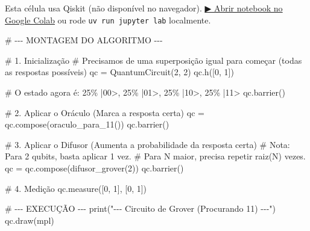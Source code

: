 \documentclass[
  brazilian,
]{report}
\newenvironment{Shaded}{\begin{snugshade}}{\end{snugshade}}
\newcommand{\BuiltInTok}[1]{\textcolor[rgb]{0.00,0.23,0.31}{#1}}
\newcommand{\CommentTok}[1]{\textcolor[rgb]{0.37,0.37,0.37}{#1}}
\newcommand{\DecValTok}[1]{\textcolor[rgb]{0.68,0.00,0.00}{#1}}
\newcommand{\NormalTok}[1]{\textcolor[rgb]{0.00,0.23,0.31}{#1}}
\newcommand{\OperatorTok}[1]{\textcolor[rgb]{0.37,0.37,0.37}{#1}}
\newcommand{\StringTok}[1]{\textcolor[rgb]{0.13,0.47,0.30}{#1}}
\begin{document}
\begin{tcolorbox}[enhanced jigsaw, arc=.35mm, bottomrule=.15mm, bottomtitle=1mm, breakable, colback=white, colbacktitle=quarto-callout-warning-color!10!white, colframe=quarto-callout-warning-color-frame, coltitle=black, left=2mm, leftrule=.75mm, opacityback=0, opacitybacktitle=0.6, rightrule=.15mm, title=\textcolor{quarto-callout-warning-color}{\faExclamationTriangle}\hspace{0.5em}{⚛️ Célula Qiskit --- execute no Colab ou localmente}, titlerule=0mm, toprule=.15mm, toptitle=1mm]

Esta célula usa Qiskit (não disponível no navegador).
\href{https://colab.research.google.com/github/maxwellamaral/aula-quantum/blob/main/notebooks/06-grover.ipynb}{▶
Abrir notebook no Google Colab} ou rode \texttt{uv\ run\ jupyter\ lab}
localmente.

\begin{Shaded}
\begin{Highlighting}[]


\CommentTok{\# {-}{-}{-} MONTAGEM DO ALGORITMO {-}{-}{-}}

\CommentTok{\# 1. Inicialização}
\CommentTok{\# Precisamos de uma superposição igual para começar (todas as respostas possíveis)}
\NormalTok{qc }\OperatorTok{=}\NormalTok{ QuantumCircuit(}\DecValTok{2}\NormalTok{, }\DecValTok{2}\NormalTok{)}
\NormalTok{qc.h([}\DecValTok{0}\NormalTok{, }\DecValTok{1}\NormalTok{])}

\CommentTok{\# O estado agora é: 25\% |00\textgreater{}, 25\% |01\textgreater{}, 25\% |10\textgreater{}, 25\% |11\textgreater{}}
\NormalTok{qc.barrier()}

\CommentTok{\# 2. Aplicar o Oráculo (Marca a resposta certa)}
\NormalTok{qc }\OperatorTok{=}\NormalTok{ qc.compose(oraculo\_para\_11())}
\NormalTok{qc.barrier()}

\CommentTok{\# 3. Aplicar o Difusor (Aumenta a probabilidade da resposta certa)}
\CommentTok{\# Nota: Para 2 qubits, basta aplicar 1 vez.}
\CommentTok{\# Para N maior, precisa repetir raiz(N) vezes.}
\NormalTok{qc }\OperatorTok{=}\NormalTok{ qc.compose(difusor\_grover(}\DecValTok{2}\NormalTok{))}
\NormalTok{qc.barrier()}

\CommentTok{\# 4. Medição}
\NormalTok{qc.measure([}\DecValTok{0}\NormalTok{, }\DecValTok{1}\NormalTok{], [}\DecValTok{0}\NormalTok{, }\DecValTok{1}\NormalTok{])}

\CommentTok{\# {-}{-}{-} EXECUÇÃO {-}{-}{-}}
\BuiltInTok{print}\NormalTok{(}\StringTok{"{-}{-}{-} Circuito de Grover (Procurando \textquotesingle{}11\textquotesingle{}) {-}{-}{-}"}\NormalTok{)}
\NormalTok{qc.draw(}\StringTok{\textquotesingle{}mpl\textquotesingle{}}\NormalTok{)}
\end{Highlighting}
\end{Shaded}

\end{tcolorbox}
\end{document}
